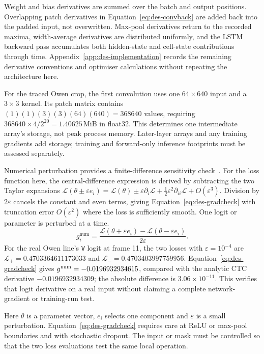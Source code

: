 Weight and bias derivatives are summed over the batch and output positions. Overlapping patch derivatives in Equation~\ref{eq:des-convback} are added back into the padded input, not overwritten. Max-pool derivatives return to the recorded maxima, width-average derivatives are distributed uniformly, and the LSTM backward pass accumulates both hidden-state and cell-state contributions through time. Appendix~\ref{app:des-implementation} records the remaining derivative conventions and optimiser calculations without repeating the architecture here.

For the traced Owen crop, the first convolution uses one $64\times640$ input and a $3\times3$ kernel. Its patch matrix contains $(1)(1)(3)(3)(64)(640)=368640$ values, requiring $368640\times4/2^{20}=1.40625$\,MiB in float32. This determines one intermediate array's storage, not peak process memory. Later-layer arrays and any training gradients add storage; training and forward-only inference footprints must be assessed separately.

Numerical perturbation provides a finite-difference sensitivity check~\cite[pp.~18--19]{jcgm2008}. For the loss function here, the central-difference expression is derived by subtracting the two Taylor expansions $\mathcal L(\theta\pm\varepsilon e_i)=\mathcal L(\theta)\pm\varepsilon\partial_i\mathcal L+\tfrac12\varepsilon^2\partial_{ii}\mathcal L+O(\varepsilon^3)$. Division by $2\varepsilon$ cancels the constant and even terms, giving Equation~\ref{eq:des-gradcheck} with truncation error $O(\varepsilon^2)$ where the loss is sufficiently smooth. One logit or parameter is perturbed at a time.
\begin{equation}
g_i^{\mathrm{num}}=\frac{\mathcal L(\theta+\varepsilon e_i)
-\mathcal L(\theta-\varepsilon e_i)}{2\varepsilon}.
\label{eq:des-gradcheck}
\end{equation}
For the real Owen line's \texttt{V} logit at frame 11, the two losses with $\varepsilon=10^{-4}$ are $\mathcal L_+=0.4703364611173033$ and $\mathcal L_-=0.4703403997759956$. Equation~\ref{eq:des-gradcheck} gives $g^{\rm num}=-0.0196932934615$, compared with the analytic CTC derivative $-0.0196932934309$; the absolute difference is $3.06\times10^{-11}$. This verifies that logit derivative on a real input without claiming a complete network-gradient or training-run test.

Here $\theta$ is a parameter vector, $e_i$ selects one component and $\varepsilon$ is a small perturbation. Equation~\ref{eq:des-gradcheck} requires care at ReLU or max-pool boundaries and with stochastic dropout. The input or mask must be controlled so that the two loss evaluations test the same local operation.

